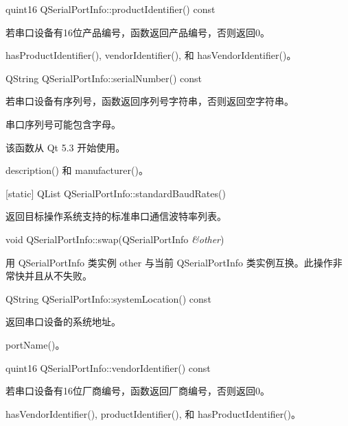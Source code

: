quint16 QSerialPortInfo::productIdentifier() const

若串口设备有16位产品编号，函数返回产品编号，否则返回0。

\begin{seeAlso}
hasProductIdentifier(), vendorIdentifier(), 和 hasVendorIdentifier()。
\end{seeAlso}

QString QSerialPortInfo::serialNumber() const

若串口设备有序列号，函数返回序列号字符串，否则返回空字符串。

\begin{notice}
串口序列号可能包含字母。
\end{notice}

该函数从 Qt 5.3 开始使用。

\begin{seeAlso}
description() 和 manufacturer()。
\end{seeAlso}

[static] QList QSerialPortInfo::standardBaudRates()

返回目标操作系统支持的标准串口通信波特率列表。

void QSerialPortInfo::swap(QSerialPortInfo \emph{\&other})

用 QSerialPortInfo 类实例 other 与当前 QSerialPortInfo 类实例互换。此操作非常快并且从不失败。

QString QSerialPortInfo::systemLocation() const

返回串口设备的系统地址。

\begin{seeAlso}
portName()。
\end{seeAlso}

quint16 QSerialPortInfo::vendorIdentifier() const

若串口设备有16位厂商编号，函数返回厂商编号，否则返回0。

\begin{seeAlso}
hasVendorIdentifier(), productIdentifier(), 和 hasProductIdentifier()。
\end{seeAlso}
